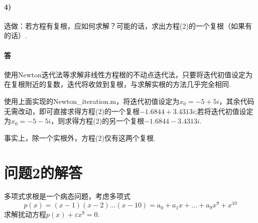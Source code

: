 \paragraph{4)} 选做：若方程有复根，应如何求解？可能的话，求出方程(2)的一个复根（如果有的话）.
\paragraph{答} 使用Newton迭代法等求解非线性方程根的不动点迭代法，只要将迭代初值设定为在复根附近的复数，迭代将收敛到复根，与求解实根的方法几乎完全相同.
\par 使用上面实现的Newton\_iteration.m，将迭代初值设定为$x_0 = -5 + 5i$，其余代码无需改动，即可直接求得方程(2)的一个复根$-1.6844 + 3.4313i$;若将迭代初值设定为$x_0 = -5 - 5i$，则求得方程(2)的另一个复根$-1.6844 - 3.4313i$.
\par 事实上，除一个实根外，方程(2)仅有这两个复根.


\section{问题2的解答}
\par 多项式求根是一个病态问题，考虑多项式
\[p(x) = (x - 1)(x - 2)\dots(x - 10) = a_0 + a_1x + \dots + a_9x^9 + x^{10}\]
求解扰动方程$p(x) + \varepsilon x^9 = 0$.

